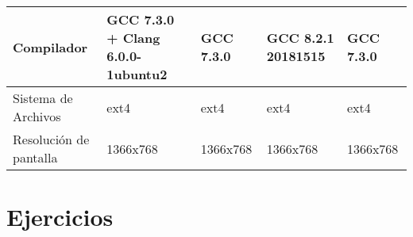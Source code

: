 \documentclass{article}
\begin{document}
\begin{table}[H]
\begin{tabularx}{\linewidth}{|L|L|L|L|L|}
Compilador             & GCC 7.3.0 + Clang 6.0.0-1ubuntu2                       & GCC 7.3.0                                                   & GCC 8.2.1 20181515                                                     & GCC 7.3.0                                                \\ \hline
{}Sistema de Archivos    & ext4                                                   & ext4                                                        & ext4                                                                   & ext4                                                     \\ \hline
{}Resolución de pantalla & 1366x768                                               & 1366x768                                                    & 1366x768                                                               & 1366x768                                                 \\ \hline
\end{tabularx}
\end{table}


    \section{Ejercicios}
\end{document}
